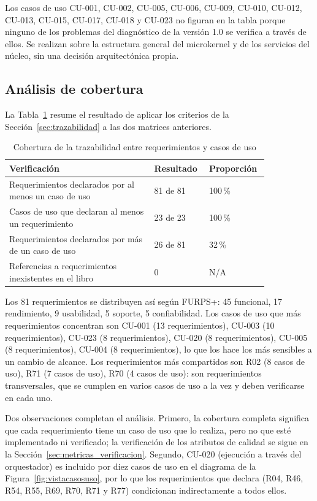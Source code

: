 \documentclass[11pt,a4paper]{article}
\DeclareRobustCommand{\_}{\textunderscore\allowbreak}
\begin{document}
Los casos de uso CU-001, CU-002, CU-005, CU-006, CU-009, CU-010, CU-012, CU-013, CU-015, CU-017, CU-018 y CU-023 no figuran en la tabla porque ninguno de los problemas del diagnóstico de la versión 1.0 se verifica a través de ellos. Se realizan sobre la estructura general del microkernel y de los servicios del núcleo, sin una decisión arquitectónica propia.


\subsection{Análisis de cobertura}
\label{sec:cobertura}

La Tabla~\ref{tab:cobertura} resume el resultado de aplicar los criterios de la Sección~\ref{sec:trazabilidad} a las dos matrices anteriores.

\begin{table}[H]
\centering
\small
\renewcommand{\arraystretch}{1.15}
\begin{tabular}{|p{0.52\linewidth}|p{0.16\linewidth}|p{0.16\linewidth}|}
\hline
\textbf{Verificación} & \textbf{Resultado} & \textbf{Proporción} \\
\hline
Requerimientos declarados por al menos un caso de uso & 81 de 81 & 100\,\% \\
\hline
Casos de uso que declaran al menos un requerimiento & 23 de 23 & 100\,\% \\
\hline
Requerimientos declarados por más de un caso de uso & 26 de 81 & 32\,\% \\
\hline
Referencias a requerimientos inexistentes en el libro & 0 & N/A \\
\hline
\end{tabular}
\caption{Cobertura de la trazabilidad entre requerimientos y casos de uso}
\label{tab:cobertura}
\end{table}

Los 81 requerimientos se distribuyen así según FURPS+: 45 funcional, 17 rendimiento, 9 usabilidad, 5 soporte, 5 confiabilidad. Los casos de uso que más requerimientos concentran son CU-001 (13 requerimientos), CU-003 (10 requerimientos), CU-023 (8 requerimientos), CU-020 (8 requerimientos), CU-005 (8 requerimientos), CU-004 (8 requerimientos), lo que los hace los más sensibles a un cambio de alcance. Los requerimientos más compartidos son R02 (8 casos de uso), R71 (7 casos de uso), R70 (4 casos de uso): son requerimientos transversales, que se cumplen en varios casos de uso a la vez y deben verificarse en cada uno.

Dos observaciones completan el análisis. Primero, la cobertura completa significa que cada requerimiento tiene un caso de uso que lo realiza, pero no que esté implementado ni verificado; la verificación de los atributos de calidad se sigue en la Sección~\ref{sec:metricas_verificacion}. Segundo, CU-020 (ejecución a través del orquestador) es incluido por diez casos de uso en el diagrama de la Figura~\ref{fig:vistacasosuso}, por lo que los requerimientos que declara (R04, R46, R54, R55, R69, R70, R71 y R77) condicionan indirectamente a todos ellos.
\end{document}
